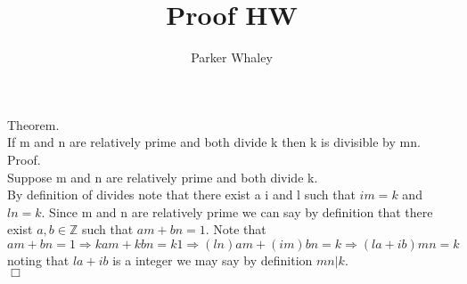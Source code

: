 \documentclass[12pt,a4paper]{article}
\author{Parker Whaley}
\title{Proof HW}
\begin{document}
\maketitle
Theorem.\\
If m and n are relatively prime and both divide k then k is divisible by mn.\\
Proof.\\
Suppose m and n are relatively prime and both divide k.\\
By definition of divides note that there exist a i and l such that $i m=k$ and $l n=k$.  Since m and n are relatively prime we can say by definition that there exist $a,b\in \mathbb{Z}$ such that $am+bn=1$.  Note that $am+bn=1 \Rightarrow kam+kbn=k1 \Rightarrow (ln)am+(im)bn=k \Rightarrow (la+ib)mn=k$ noting that $la+ib$ is a integer we may say by definition $mn|k$.\\ $\Box$
\end{document}
